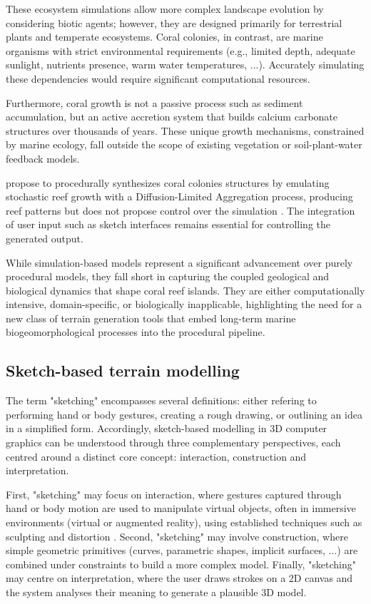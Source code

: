 These ecosystem simulations allow more complex landscape evolution by considering biotic agents; however, they are designed primarily for terrestrial plants and temperate ecosystems. Coral colonies, in contrast, are marine organisms with strict environmental requirements (e.g., limited depth, adequate sunlight, nutrients presence, warm water temperatures, ...). Accurately simulating these dependencies would require significant computational resources. 

Furthermore, coral growth is not a passive process such as sediment accumulation, but an active accretion system that builds calcium carbonate structures over thousands of years. These unique growth mechanisms, constrained by marine ecology, fall outside the scope of existing vegetation or soil-plant-water feedback models.

 propose to procedurally synthesizes coral colonies structures by emulating stochastic reef growth with a Diffusion-Limited Aggregation process, producing reef patterns but does not propose control over the simulation \cite{Li2021}. The integration of user input such as sketch interfaces remains essential for controlling the generated output.

\midConclusion

While simulation-based models represent a significant advancement over purely procedural models, they fall short in capturing the coupled geological and biological dynamics that shape coral reef islands. They are either computationally intensive, domain-specific, or biologically inapplicable, highlighting the need for a new class of terrain generation tools that embed long-term marine biogeomorphological processes into the procedural pipeline.


\subsection{Sketch-based terrain modelling}
\label{sec:coral-island-sota-sketches}

The term "sketching" encompasses several definitions: either refering to performing hand or body gestures, creating a rough drawing, or outlining an idea in a simplified form. Accordingly, sketch-based modelling in 3D computer graphics can be understood through three complementary perspectives, each centred around a distinct core concept: interaction, construction and interpretation.

First, "sketching" may focus on interaction, where gestures captured through hand or body motion are used to manipulate virtual objects, often in immersive environments (virtual or augmented reality), using established techniques such as sculpting and distortion \cite{Olsen2009, Cook2009}. Second, "sketching" may involve construction, where simple geometric primitives (curves, parametric shapes, implicit surfaces, ...) are combined under constraints to build a more complex model. Finally, "sketching" may centre on interpretation, where the user draws strokes on a 2D canvas and the system analyses their meaning to generate a plausible 3D model.

